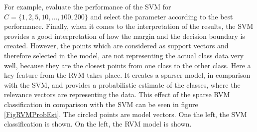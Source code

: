 For example, evaluate the performance of the \ac{SVM} for $C=\{1,2,5,10,...,100,200\}$ and select the parameter according to the best performance.\cite{Chen.2009}\newline
Finally, when it comes to the interpretation of the results, the \ac{SVM} provides a good interpretation of how the margin and the decision boundary is created.
However, the points which are considered as support vectors and therefore selected in the model, are not representing the actual class data very well, because they are the closest points from one class to the other class.\cite[p. 326]{Bishop.2009}\newline
Here a key feature from the \ac{RVM} takes place. It creates a sparser model, in comparison with the \ac{SVM}, and provides a probabilistic estimate of the classes, where the relevance vectors are representing the data.\cite[p. 335-356]{Bishop.2009}\newline
This effect of the sparse \acs{RVM} classification in comparison with the \acs{SVM} can be seen in figure \ref{FigRVMProbEst}.
The circled points are model vectors. One the left, the \acs{SVM} classification is shown. On the left, the \acs{RVM} model is shown.
